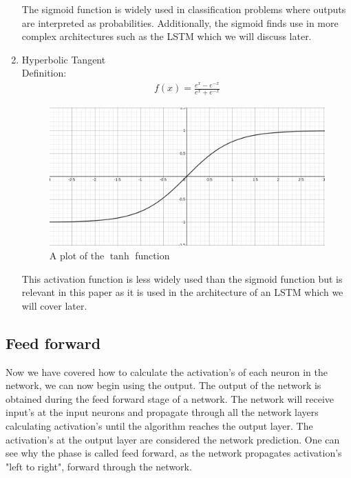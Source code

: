 \documentclass{article}
\begin{document}
\begin{enumerate}
\begin{figure}[H]
\end{figure}
The sigmoid function is widely used in classification problems where outputs are interpreted as probabilities. Additionally, the sigmoid finds use in more complex architectures such as the LSTM which we will discuss later. 
\item Hyperbolic Tangent\\
Definition:
\begin{align*}
f(x) = \frac{e^x - e^{-x}}{e^x + e^{-x}}
\end{align*}

\begin{figure}[H]
\centering
\caption{A plot of the $\tanh$ function}
\includegraphics[scale=0.2]{tanh.png}
\end{figure}
This activation function is less widely used than the sigmoid function but is relevant in this paper as it is used in the architecture of an LSTM which we will cover later.
\end{enumerate}

\subsection{Feed forward}
\label{sec:forward}
Now we have covered how to calculate the activation's of each neuron in the network, we can now begin using the output. The output of the network is obtained during the feed forward stage of a network. The network will receive input's at the input neurons and propagate through all the network layers calculating activation's until the algorithm reaches the output layer. The activation's at the output layer are considered the network prediction. One can see why the phase is called feed forward, as the network propagates activation's "left to right", forward through the network. 
\end{document}
